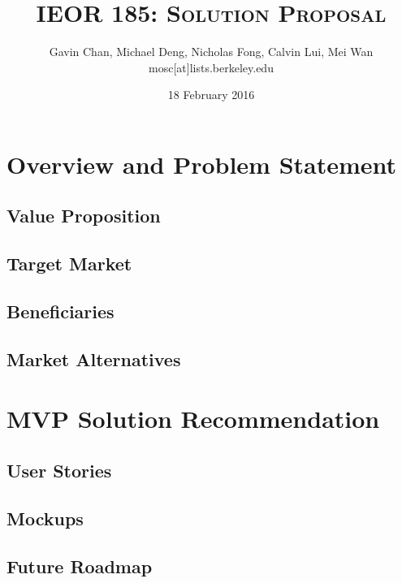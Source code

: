 \documentclass[10pt]{article}
\begin{document}
\title{\textsc{IEOR 185: Solution Proposal}}
\author{
    Gavin Chan,
    Michael Deng,
    Nicholas Fong,
    Calvin Lui,
    Mei Wan\\
    mosc[at]lists.berkeley.edu\\
}
\date{18 February 2016}
\maketitle

\section{Overview and Problem Statement}
\subsection{Value Proposition}
\subsection{Target Market}
\subsection{Beneficiaries}
\subsection{Market Alternatives}
\subsubsection{}
\subsubsection{}
\subsubsection{}

\section{MVP Solution Recommendation}
\subsection{User Stories}
\subsection{Mockups}
\subsection{Future Roadmap}
\end{document}

